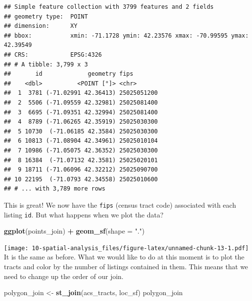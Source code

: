 \documentclass[
]{book}
\newenvironment{Shaded}{\begin{snugshade}}{\end{snugshade}}
\newcommand{\DataTypeTok}[1]{\textcolor[rgb]{0.13,0.29,0.53}{#1}}
\newcommand{\KeywordTok}[1]{\textcolor[rgb]{0.13,0.29,0.53}{\textbf{#1}}}
\newcommand{\NormalTok}[1]{#1}
\newcommand{\OperatorTok}[1]{\textcolor[rgb]{0.81,0.36,0.00}{\textbf{#1}}}
\newcommand{\StringTok}[1]{\textcolor[rgb]{0.31,0.60,0.02}{#1}}
\begin{document}
\begin{verbatim}
## Simple feature collection with 3799 features and 2 fields
## geometry type:  POINT
## dimension:      XY
## bbox:           xmin: -71.1728 ymin: 42.23576 xmax: -70.99595 ymax: 42.39549
## CRS:            EPSG:4326
## # A tibble: 3,799 x 3
##       id             geometry fips       
##    <dbl>          <POINT [°]> <chr>      
##  1  3781 (-71.02991 42.36413) 25025051200
##  2  5506 (-71.09559 42.32981) 25025081400
##  3  6695 (-71.09351 42.32994) 25025081400
##  4  8789 (-71.06265 42.35919) 25025030300
##  5 10730  (-71.06185 42.3584) 25025030300
##  6 10813 (-71.08904 42.34961) 25025010104
##  7 10986 (-71.05075 42.36352) 25025030300
##  8 16384  (-71.07132 42.3581) 25025020101
##  9 18711 (-71.06096 42.32212) 25025090700
## 10 22195  (-71.0793 42.34558) 25025010600
## # ... with 3,789 more rows
\end{verbatim}

This is great! We now have the \texttt{fips} (census tract code) associated with each listing \texttt{id}. But what happens when we plot the data?

\begin{Shaded}
\begin{Highlighting}[]
\KeywordTok{ggplot}\NormalTok{(points\_join) }\OperatorTok{+}
\StringTok{  }\KeywordTok{geom\_sf}\NormalTok{(}\DataTypeTok{shape =} \StringTok{"."}\NormalTok{)}
\end{Highlighting}
\end{Shaded}

\texttt{[image: 10-spatial-analysis\_files/figure-latex/unnamed-chunk-13-1.pdf]}
It is the same as before. What we would like to do at this moment is to plot the tracts and color by the number of listings contained in them. This means that we need to change up the order of our join.

\begin{Shaded}
\begin{Highlighting}[]
\NormalTok{polygon\_join \textless{}{-}}\StringTok{ }\KeywordTok{st\_join}\NormalTok{(acs\_tracts, loc\_sf)}
\NormalTok{polygon\_join}
\end{Highlighting}
\end{Shaded}
\end{document}
